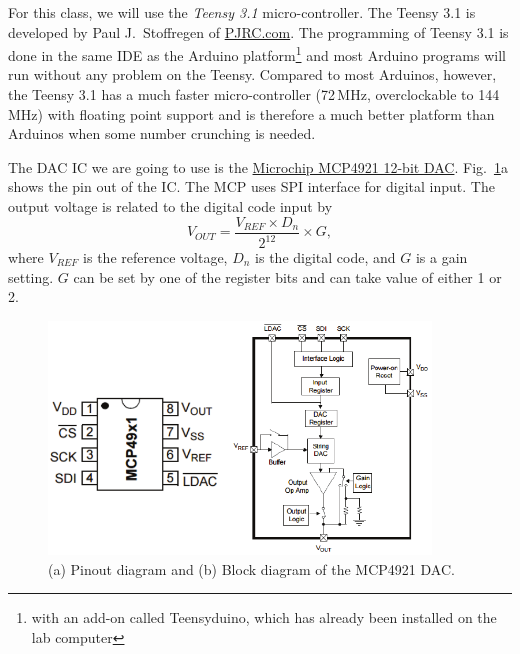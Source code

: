 \documentclass[letterpaper, 11pt]{article}
\begin{document}
For this class, we will use the \textit{Teensy 3.1} micro-controller. The Teensy 3.1 is developed by Paul J.~Stoffregen of \href{https://www.pjrc.com}{PJRC.com}. The programming of Teensy 3.1 is done in the same IDE as the Arduino platform\footnote{with an add-on called Teensyduino, which has already been installed on the lab computer} and most Arduino programs will run without any problem on the Teensy. Compared to most Arduinos, however, the Teensy 3.1 has a much faster micro-controller (72\,MHz, overclockable to 144\,MHz) with floating point support and is therefore a much better platform than Arduinos when some number crunching is needed. 

The DAC IC we are going to use is the \href{http://www.microchip.com/wwwproducts/Devices.aspx?product=MCP4921}{Microchip MCP4921 12-bit DAC}. Fig.~\ref{fig:mcp4921}a shows the pin out of the IC. The MCP uses SPI interface for digital input. The output voltage is related to the digital code input by
\[
	V_{OUT} = \frac{V_{REF} \times D_n}{2^{12}} \times G,
\]
where $V_{REF}$ is the reference voltage, $D_n$ is the digital code, and $G$ is a gain setting. $G$ can be set by one of the register bits and can take value of either 1 or 2. 


	\begin{figure}[h]
		\centering
		\includegraphics[width=4in]{mcp4921}
		\caption{(a) Pinout diagram and (b) Block diagram of the MCP4921 DAC.}
		\label{fig:mcp4921}
	\end{figure}
\end{document}
